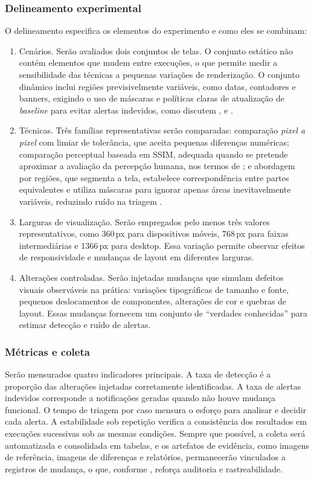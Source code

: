 \documentclass{UNESC}
\begin{document}
\subsubsection{Delineamento experimental}
O delineamento especifica os elementos do experimento e como eles se combinam:
\begin{enumerate}[label=\alph*),leftmargin=1.5em]
    \item Cenários. Serão avaliados dois conjuntos de telas. O conjunto estático não contém elementos que mudem entre execuções, o que permite medir a sensibilidade das técnicas a pequenas variações de renderização. O conjunto dinâmico inclui regiões previsivelmente variáveis, como datas, contadores e banners, exigindo o uso de máscaras e políticas claras de atualização de \emph{baseline} para evitar alertas indevidos, como discutem ,  e .
    \item Técnicas. Três famílias representativas serão comparadas: comparação \emph{pixel a pixel} com limiar de tolerância, que aceita pequenas diferenças numéricas; comparação perceptual baseada em SSIM, adequada quando se pretende aproximar a avaliação da percepção humana, nos termos de ; e abordagem por regiões, que segmenta a tela, estabelece correspondência entre partes equivalentes e utiliza máscaras para ignorar apenas áreas inevitavelmente variáveis, reduzindo ruído na triagem \cite{tanno2020}.
    \item Larguras de visualização. Serão empregados pelo menos três valores representativos, como 360\,px para dispositivos móveis, 768\,px para faixas intermediárias e 1366\,px para desktop. Essa variação permite observar efeitos de responsividade e mudanças de layout em diferentes larguras.
    \item Alterações controladas. Serão injetadas mudanças que simulam defeitos visuais observáveis na prática: variações tipográficas de tamanho e fonte, pequenos deslocamentos de componentes, alterações de cor e quebras de layout. Essas mudanças fornecem um conjunto de “verdades conhecidas” para estimar detecção e ruído de alertas.
\end{enumerate}

\subsubsection{Métricas e coleta}
Serão mensurados quatro indicadores principais. A taxa de detecção é a proporção das alterações injetadas corretamente identificadas. A taxa de alertas indevidos corresponde a notificações geradas quando não houve mudança funcional. O tempo de triagem por caso mensura o esforço para analisar e decidir cada alerta. A estabilidade sob repetição verifica a consistência dos resultados em execuções sucessivas sob as mesmas condições. Sempre que possível, a coleta será automatizada e consolidada em tabelas, e os artefatos de evidência, como imagens de referência, imagens de diferenças e relatórios, permanecerão vinculados a registros de mudança, o que, conforme , reforça auditoria e rastreabilidade.
\end{document}
